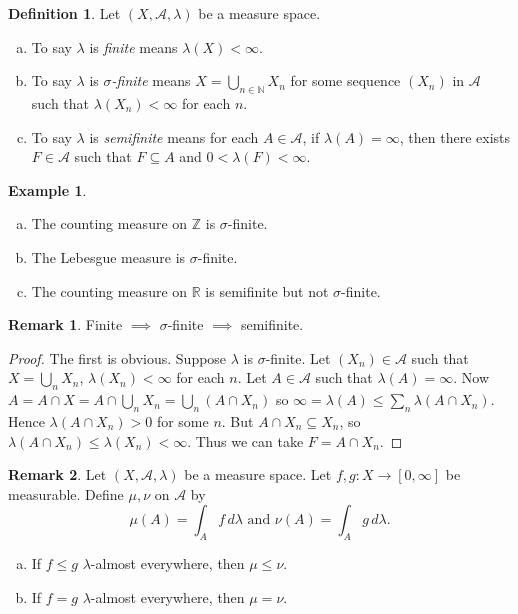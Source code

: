 \documentclass{article}
\newcommand{\R}{\mathbb{R}}
\newcommand{\Z}{\mathbb{Z}}
\newcommand{\N}{\mathbb{N}}
\theoremstyle{definition}
\newtheorem*{example}{Example}
\newtheorem*{definition}{Definition}
\newtheorem*{remark}{Remark}
\begin{document}
\begin{definition}
Let $(X, \mathscr{A}, \lambda)$ be a measure space.
\begin{enumerate}[(a)]
    \item To say $\lambda$ is \emph{finite} means $\lambda(X) < \infty$.
    \item To say $\lambda$ is \emph{$\sigma$-finite} means $X = \bigcup_{n \in \N} X_n$ for some sequence $(X_n)$ in $\mathscr{A}$ such that $\lambda(X_n) < \infty$ for each $n$.
    \item To say $\lambda$ is \emph{semifinite} means for each $A \in \mathscr{A}$, if $\lambda(A) = \infty$, then there exists $F \in \mathscr{A}$ such that $F \subseteq A$ and $0 < \lambda(F) < \infty$.
\end{enumerate}
\end{definition}

\begin{example}
\begin{enumerate}[(a)]
    \item The counting measure on $\Z$ is $\sigma$-finite.
    \item The Lebesgue measure is $\sigma$-finite.
    \item The counting measure on $\R$ is semifinite but not $\sigma$-finite.
\end{enumerate}
\end{example}

\begin{remark}
Finite $\implies$ $\sigma$-finite $\implies$ semifinite.
\begin{proof}
    The first is obvious. Suppose $\lambda$ is $\sigma$-finite. Let $(X_n) \in \mathscr{A}$ such that $X = \bigcup_n X_n$, $\lambda(X_n) < \infty$ for each $n$. Let $A \in \mathscr{A}$ such that $\lambda(A) = \infty$. Now $A = A \cap X = A \cap \bigcup_n X_n = \bigcup_n (A \cap X_n)$ so $\infty = \lambda(A) \leq \sum_n \lambda(A \cap X_n)$. Hence $\lambda(A \cap X_n) > 0$ for some $n$. But $A \cap X_n \subseteq X_n$, so $\lambda(A \cap X_n) \leq \lambda(X_n) < \infty$. Thus we can take $F = A \cap X_n$.
\end{proof}
\end{remark}

\begin{remark}
Let $(X, \mathscr{A}, \lambda)$ be a measure space. Let $f, g : X \longrightarrow [0, \infty]$ be measurable. Define $\mu, \nu$ on $\mathscr{A}$ by
\[
    \mu(A) = \int_A f\,d\lambda \text{ and } \nu(A) = \int_A g\,d\lambda.
\]
\begin{enumerate}[(a)]
    \item If $f \leq g$ $\lambda$-almost everywhere, then $\mu \leq \nu$.
    \item If $f = g$ $\lambda$-almost everywhere, then $\mu = \nu$.
\end{enumerate}
\end{remark}
\end{document}

